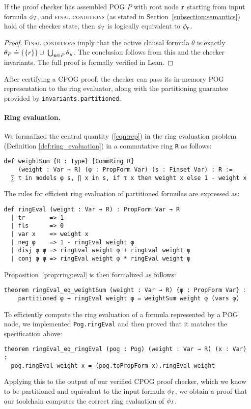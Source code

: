 \begin{thm}
\label{thm:lean:equiv}
If the proof checker has assembled POG $P$ with root node $\mathbf{r}$ starting from input formula $\phi_I$, and \textsc{final conditions} (as stated in Section~\ref{subsection:semantics}) hold of the checker state, then $\phi_I$ is logically equivalent to $\phi_{\mathbf{r}}$.
\end{thm}
\begin{proof}
\textsc{Final conditions} imply that the active clausal formula $\theta$ is exactly $\theta_P \doteq \{\{r\}\} \cup \; \bigcup_{\mathbf{u} \in P} \theta_{u}$. The conclusion follows from this and the checker invariants. The full proof is formally verified in Lean.
\end{proof}
After certifying a CPOG proof, the checker can pass its in-memory POG representation to the ring evaluator, along with the partitioning guarantee provided by \texttt{invariants.partitioned}.

\paragraph{Ring evaluation.} We formalized the central quantity (\ref{eqn:rep}) in the ring evaluation problem
(Definition \ref{def:ring_evaluation}) in a commutative ring \lstinline{R} as follows:
\begin{lstlisting}
def weightSum {R : Type} [CommRing R]
    (weight : Var → R) (φ : PropForm Var) (s : Finset Var) : R :=
  ∑ τ in models φ s, ∏ x in s, if τ x then weight x else 1 - weight x
\end{lstlisting}
The rules for efficient ring evaluation of partitioned formulas are expressed as:
\begin{lstlisting}
def ringEval (weight : Var → R) : PropForm Var → R
  | tr       => 1
  | fls      => 0
  | var x    => weight x
  | neg φ    => 1 - ringEval weight φ
  | disj φ ψ => ringEval weight φ + ringEval weight ψ
  | conj φ ψ => ringEval weight φ * ringEval weight ψ
\end{lstlisting}
Proposition~\ref{prop:ring:eval} is then formalized as follows:
\begin{lstlisting}
theorem ringEval_eq_weightSum (weight : Var → R) {φ : PropForm Var} :
    partitioned φ → ringEval weight φ = weightSum weight φ (vars φ)
\end{lstlisting}
To efficiently compute the ring evaluation of a formula represented by a POG node, we implemented
\lstinline{Pog.ringEval} and then proved that it matches the specification above:
\begin{lstlisting}
theorem ringEval_eq_ringEval (pog : Pog) (weight : Var → R) (x : Var) :
  pog.ringEval weight x = (pog.toPropForm x).ringEval weight
\end{lstlisting}
Applying this to the output of our verified CPOG proof checker, which we know to be partitioned
and equivalent to the input formula $\phi_I$, we obtain a proof that our toolchain computes
the correct ring evaluation of $\phi_I$.

